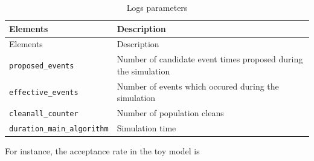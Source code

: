 \begin{longtable}[]{@{}ll@{}}
\caption{Logs parameters}\tabularnewline
\toprule
\begin{minipage}[b]{0.27\columnwidth}\raggedright
Elements\strut
\end{minipage} & \begin{minipage}[b]{0.67\columnwidth}\raggedright
Description\strut
\end{minipage}\tabularnewline
\midrule
\endfirsthead
\toprule
\begin{minipage}[b]{0.27\columnwidth}\raggedright
Elements\strut
\end{minipage} & \begin{minipage}[b]{0.67\columnwidth}\raggedright
Description\strut
\end{minipage}\tabularnewline
\midrule
\endhead
\begin{minipage}[t]{0.27\columnwidth}\raggedright
\texttt{proposed\_events}\strut
\end{minipage} & \begin{minipage}[t]{0.67\columnwidth}\raggedright
Number of candidate event times proposed during the simulation\strut
\end{minipage}\tabularnewline
\begin{minipage}[t]{0.27\columnwidth}\raggedright
\texttt{effective\_events}\strut
\end{minipage} & \begin{minipage}[t]{0.67\columnwidth}\raggedright
Number of events which occured during the simulation\strut
\end{minipage}\tabularnewline
\begin{minipage}[t]{0.27\columnwidth}\raggedright
\texttt{cleanall\_counter}\strut
\end{minipage} & \begin{minipage}[t]{0.67\columnwidth}\raggedright
Number of population cleans\strut
\end{minipage}\tabularnewline
\begin{minipage}[t]{0.27\columnwidth}\raggedright
\texttt{duration\_main\_algorithm}\strut
\end{minipage} & \begin{minipage}[t]{0.67\columnwidth}\raggedright
Simulation time\strut
\end{minipage}\tabularnewline
\bottomrule
\end{longtable}

For instance, the acceptance rate in the toy model is

